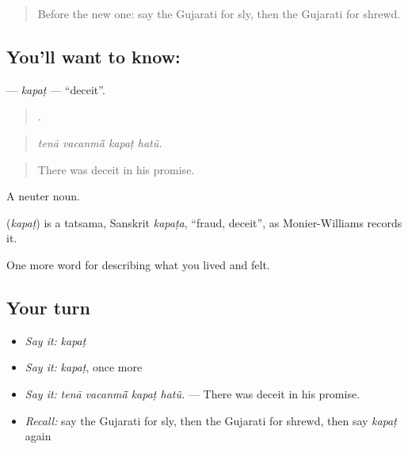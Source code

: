 \label{lesson:GU-C460-kapat}



\begin{quote}
Before the new one: say the Gujarati for sly, then the Gujarati for shrewd.
\end{quote}

\subsection*{You'll want to know: }
\textbf{} — \emph{kapaṭ} — \textquotedblleft{}deceit\textquotedblright{}.

\begin{quote}
   .
\end{quote}

\begin{quote}
\emph{tenā vacanmā̃ kapaṭ hatũ.}
\end{quote}

\begin{quote}
There was deceit in his promise.
\end{quote}

A neuter noun.

\begin{cousinweb}
\textbf{} (\emph{kapaṭ}) is a tatsama, Sanskrit \emph{kapaṭa}, \textquotedblleft{}fraud, deceit\textquotedblright{}, as Monier-Williams records it.
\end{cousinweb}

\begin{grammarlens}[title={What you've built}]
One more word for describing what you lived and felt.
\end{grammarlens}

\subsection*{Your turn}
\begin{itemize}
\raggedright
  \item \emph{Say it:} \emph{kapaṭ}
  \item \emph{Say it:} \emph{kapaṭ}, once more
  \item \emph{Say it:} \emph{tenā vacanmā̃ kapaṭ hatũ.} — There was deceit in his promise.
  \item \emph{Recall:} say the Gujarati for sly, then the Gujarati for shrewd, then say \emph{kapaṭ} again
\end{itemize}

